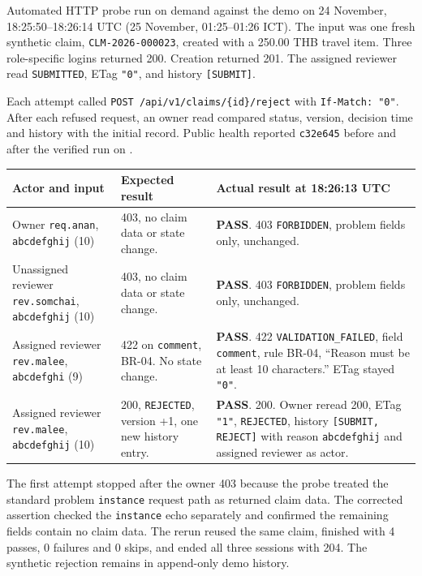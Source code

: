\label{ev:live}
Automated HTTP probe run on demand against the demo on 24 November, 18:25:50--18:26:14 UTC (25 November, 01:25--01:26 ICT). The input was one fresh synthetic claim, \texttt{CLM-2026-000023}, created with a 250.00 THB travel item. Three role-specific logins returned 200. Creation returned 201. The assigned reviewer read \texttt{SUBMITTED}, ETag \texttt{"0"}, and history \texttt{[SUBMIT]}.

Each attempt called \texttt{POST /api/v1/claims/\{id\}/reject} with \texttt{If-Match: "0"}. After each refused request, an owner read compared status, version, decision time and history with the initial record. Public health reported \texttt{c32e645} before and after the verified run on \revision{}.

\begin{longtable}{@{}R{4.2cm}R{4.8cm}R{7.1cm}@{}}
\toprule
\textbf{Actor and input} & \textbf{Expected result} & \textbf{Actual result at 18:26:13 UTC} \\ \midrule \endhead
Owner \texttt{req.anan}, \texttt{abcdefghij} (10) & 403, no claim data or state change. & \textbf{PASS}. 403 \texttt{FORBIDDEN}, problem fields only, unchanged. \\
Unassigned reviewer \texttt{rev.somchai}, \texttt{abcdefghij} (10) & 403, no claim data or state change. & \textbf{PASS}. 403 \texttt{FORBIDDEN}, problem fields only, unchanged. \\
Assigned reviewer \texttt{rev.malee}, \texttt{abcdefghi} (9) & 422 on \texttt{comment}, BR-04. No state change. & \textbf{PASS}. 422 \texttt{VALIDATION\_FAILED}, field \texttt{comment}, rule BR-04, “Reason must be at least 10 characters.” ETag stayed \texttt{"0"}. \\
Assigned reviewer \texttt{rev.malee}, \texttt{abcdefghij} (10) & 200, \texttt{REJECTED}, version +1, one new history entry. & \textbf{PASS}. 200. Owner reread 200, ETag \texttt{"1"}, \texttt{REJECTED}, history \texttt{[SUBMIT, REJECT]} with reason \texttt{abcdefghij} and assigned reviewer as actor. \\
\bottomrule
\end{longtable}
The first attempt stopped after the owner 403 because the probe treated the standard problem \texttt{instance} request path as returned claim data. The corrected assertion checked the \texttt{instance} echo separately and confirmed the remaining fields contain no claim data. The rerun reused the same claim, finished with 4 passes, 0 failures and 0 skips, and ended all three sessions with 204. The synthetic rejection remains in append-only demo history.
